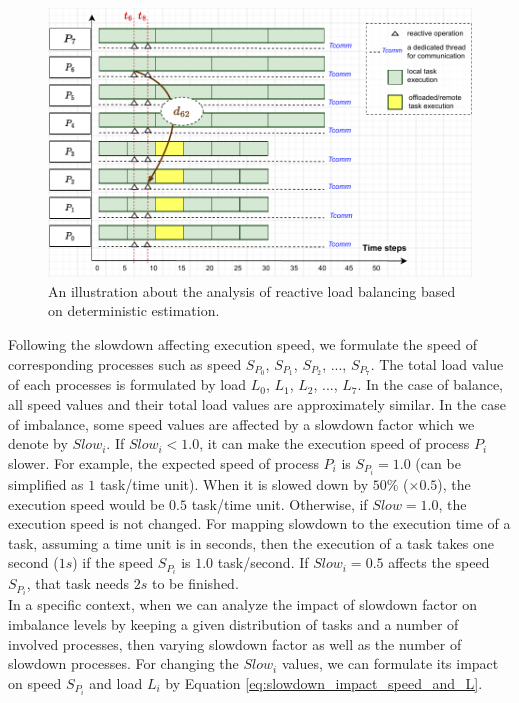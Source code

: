 \begin{figure}[t]
  \centering
  \includegraphics[scale=0.65]{./pictures/perf_analysis_model/perf_illustration_reactlb_behavior_for_perf_model.pdf}
	\caption{An illustration about the analysis of reactive load balancing based on deterministic estimation.}
	\label{fig:perfmodel_reactlb_deterministic_estimation}
\end{figure}

Following the slowdown affecting execution speed, we formulate the speed of corresponding processes such as speed $S_{P_{0}}$, $S_{P_{1}}$, $S_{P_{2}}$, ..., $S_{P_{7}}$. The total load value of each processes is formulated by load $L_{0}$, $L_{1}$, $L_{2}$, ..., $L_{7}$. In the case of balance, all speed values and their total load values are approximately similar. In the case of imbalance, some speed values are affected by a slowdown factor which we denote by $Slow_{i}$. If $Slow_{i} < 1.0$, it can make the execution speed of process $P_{i}$ slower. For example, the expected speed of process $P_{i}$ is $S_{P_{i}} = 1.0$ (can be simplified as $1$ task/time unit). When it is slowed down by $50\%$ ($\times 0.5$), the execution speed would be $0.5$ task/time unit. Otherwise, if $Slow = 1.0$, the execution speed is not changed. For mapping slowdown to the execution time of a task, assuming a time unit is in seconds, then the execution of a task takes one second ($1s$) if the speed $S_{P_{i}}$ is $1.0$ task/second. If $Slow_{i} = 0.5$ affects the speed $S_{P_{i}}$, that task needs $2s$ to be finished.\\

In a specific context, when we can analyze the impact of slowdown factor on imbalance levels by keeping a given distribution of tasks and a number of involved processes, then varying slowdown factor as well as the number of slowdown processes. For changing the $Slow_{i}$ values, we can formulate its impact on speed $S_{P_{i}}$ and load $L_{i}$ by Equation \ref{eq:slowdown_impact_speed_and_L}.

